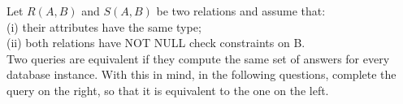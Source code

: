 

\question Let $R(A, B)$ and $S(A, B)$ be two relations and assume that:\\
(i) their attributes have the same type; \\
(ii) both relations have NOT NULL check constraints on B. \\
Two queries are equivalent if they compute the same set of answers for 
every database instance. With this in mind, in the following questions,
complete the query on the right, so that it is equivalent to the one on
the left. 

